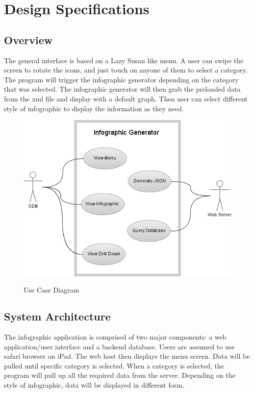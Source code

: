 \documentclass[11pt,a4paper,oneside]{article}
\begin{document}
\section{Design Specifications}

\subsection{Overview}

The general interface is based on a Lazy Susan like menu. A user can swipe the screen to rotate the icons, and just touch on anyone of them to select a category. The program will trigger the infographic generator depending on the category that was selected. The infographic generator will then grab the preloaded data from the xml file and display with a default graph. Then user can select different style of infographic to display the information as they need.\\

\begin{figure}[!]
\caption{Use Case Diagram}
\includegraphics[width=1\textwidth]{images/Capstone_-_Use_Case_Diagram.png}\\   
\end{figure}


\subsection{System Architecture}

The infographic application is comprised of two major components: a web application/user interface and a backend database. Users are assumed to use safari browser on iPad. The web host then displays the menu screen. Data will be pulled until specific category is selected. When a category is selected, the program will pull up all the required data from the server. Depending on the style of infographic, data will be displayed in different form.\\
\end{document}
